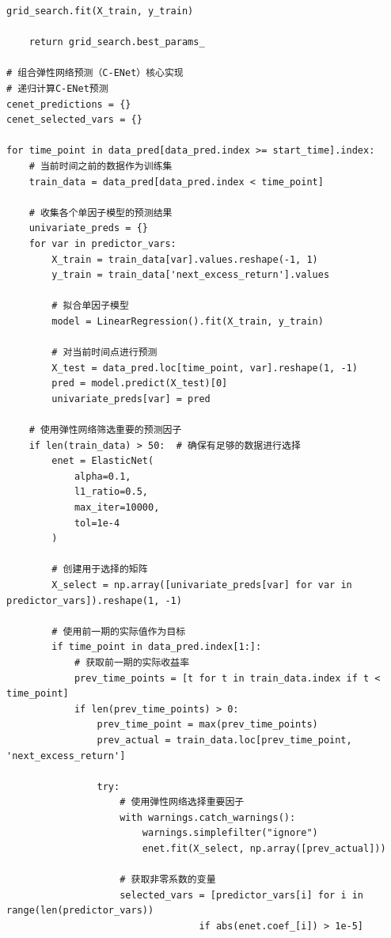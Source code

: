 \documentclass[12pt, a4paper]{article}
\begin{document}
\begin{lstlisting}[basicstyle=\small\ttfamily, breaklines=true, columns=fullflexible]
    grid_search.fit(X_train, y_train)
    
    return grid_search.best_params_

# 组合弹性网络预测（C-ENet）核心实现
# 递归计算C-ENet预测
cenet_predictions = {}
cenet_selected_vars = {}

for time_point in data_pred[data_pred.index >= start_time].index:
    # 当前时间之前的数据作为训练集
    train_data = data_pred[data_pred.index < time_point]
    
    # 收集各个单因子模型的预测结果
    univariate_preds = {}
    for var in predictor_vars:
        X_train = train_data[var].values.reshape(-1, 1)
        y_train = train_data['next_excess_return'].values
        
        # 拟合单因子模型
        model = LinearRegression().fit(X_train, y_train)
        
        # 对当前时间点进行预测
        X_test = data_pred.loc[time_point, var].reshape(1, -1)
        pred = model.predict(X_test)[0]
        univariate_preds[var] = pred
    
    # 使用弹性网络筛选重要的预测因子
    if len(train_data) > 50:  # 确保有足够的数据进行选择
        enet = ElasticNet(
            alpha=0.1, 
            l1_ratio=0.5,
            max_iter=10000,
            tol=1e-4
        )
        
        # 创建用于选择的矩阵
        X_select = np.array([univariate_preds[var] for var in predictor_vars]).reshape(1, -1)
        
        # 使用前一期的实际值作为目标
        if time_point in data_pred.index[1:]:
            # 获取前一期的实际收益率
            prev_time_points = [t for t in train_data.index if t < time_point]
            if len(prev_time_points) > 0:
                prev_time_point = max(prev_time_points)
                prev_actual = train_data.loc[prev_time_point, 'next_excess_return']
                
                try:
                    # 使用弹性网络选择重要因子
                    with warnings.catch_warnings():
                        warnings.simplefilter("ignore")
                        enet.fit(X_select, np.array([prev_actual]))
                    
                    # 获取非零系数的变量
                    selected_vars = [predictor_vars[i] for i in range(len(predictor_vars)) 
                                  if abs(enet.coef_[i]) > 1e-5]
                    

\end{lstlisting}
\end{document}
